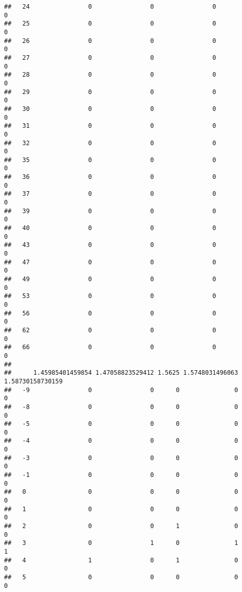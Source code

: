\documentclass[]{article}
\begin{document}
\begin{verbatim}
##   24                0                0                0                0
##   25                0                0                0                0
##   26                0                0                0                0
##   27                0                0                0                0
##   28                0                0                0                0
##   29                0                0                0                0
##   30                0                0                0                0
##   31                0                0                0                0
##   32                0                0                0                0
##   35                0                0                0                0
##   36                0                0                0                0
##   37                0                0                0                0
##   39                0                0                0                0
##   40                0                0                0                0
##   43                0                0                0                0
##   47                0                0                0                0
##   49                0                0                0                0
##   53                0                0                0                0
##   56                0                0                0                0
##   62                0                0                0                0
##   66                0                0                0                0
##     
##      1.45985401459854 1.47058823529412 1.5625 1.5748031496063 1.58730158730159
##   -9                0                0      0               0                0
##   -8                0                0      0               0                0
##   -5                0                0      0               0                0
##   -4                0                0      0               0                0
##   -3                0                0      0               0                0
##   -1                0                0      0               0                0
##   0                 0                0      0               0                0
##   1                 0                0      0               0                0
##   2                 0                0      1               0                0
##   3                 0                1      0               1                1
##   4                 1                0      1               0                0
##   5                 0                0      0               0                0

\end{verbatim}
\end{document}
